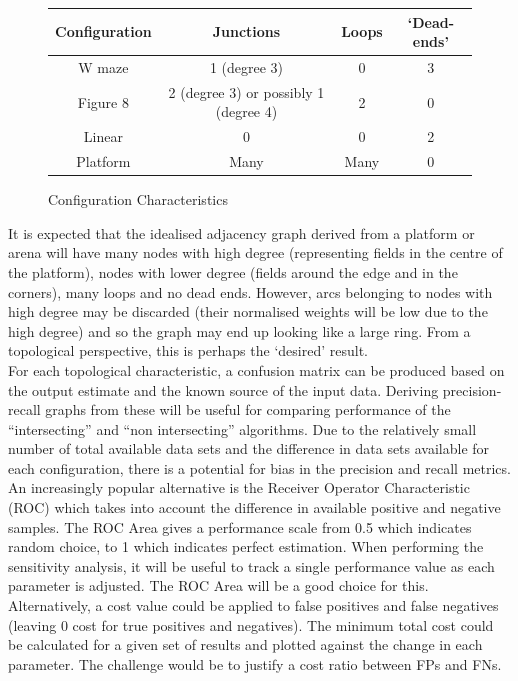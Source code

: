 \documentclass[11pt]{report}
\begin{document}
\begin{figure}[h!]
\caption{Configuration Characteristics}
\centering
\begin{tabular}{|c|c|c|c|}
\hline
Configuration & Junctions & Loops & `Dead-ends' \\
\hline
W maze & 1 (degree 3) & 0 & 3 \\
\hline
Figure 8 & 2 (degree 3) or possibly 1 (degree 4) & 2 & 0 \\
\hline
Linear & 0 & 0 & 2 \\
\hline
Platform & Many & Many & 0 \\
\hline
\end{tabular}
\label{fig:h}
\end{figure}

It is expected that the idealised adjacency graph derived from a platform or arena will have many nodes with high degree (representing fields in the centre of the platform), nodes with lower degree (fields around the edge and in the corners), many loops and no dead ends. However, arcs belonging to nodes with high degree may be discarded (their normalised weights will be low due to the high degree) and so the graph may end up looking like a large ring. From a topological perspective, this is perhaps the `desired' result. \\
 
For each topological characteristic, a confusion matrix can be produced based on the output estimate and the known source of the input data. Deriving precision-recall graphs from these will be useful for comparing performance of the “intersecting” and “non intersecting” algorithms. Due to the relatively small number of total available data sets and the difference in data sets available for each configuration, there is a potential for bias in the precision and recall metrics. An increasingly popular alternative is the Receiver Operator Characteristic (ROC) which takes into account the difference in available positive and negative samples. The ROC Area gives a performance scale from 0.5 which indicates random choice, to 1 which indicates perfect estimation. When performing the sensitivity analysis, it will be useful to track a single performance value as each parameter is adjusted. The ROC Area will be a good choice for this. Alternatively, a cost value could be applied to false positives and false negatives (leaving 0 cost for true positives and negatives). The minimum total cost could be calculated for a given set of results and plotted against the change in each parameter. The challenge would be to justify a cost ratio between FPs and FNs.\\

\newpage
\medskip



\appendix
\end{document}
